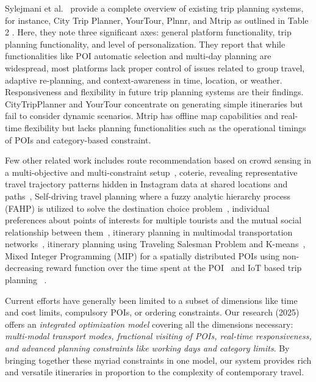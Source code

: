 Sylejmani et al.~\cite{sylejmani2011survey} provide a complete overview of existing trip planning systems, for instance, City Trip Planner, YourTour, Plnnr, and Mtrip as outlined in Table 2 . Here, they note three significant axes: general platform functionality, trip planning functionality, and level of personalization. They report that while functionalities like POI automatic selection and multi-day planning are widespread, most platforms lack proper control of issues related to group travel, adaptive re-planning, and context-awareness in time, location, or weather. Responsiveness and flexibility in future trip planning systems are their findings. CityTripPlanner and YourTour concentrate on generating simple itineraries but fail to consider dynamic scenarios. Mtrip has offline map capabilities and real-time flexibility but lacks planning functionalities such as the operational timings of POIs and category-based constraint.

Few other related work includes route recommendation based on crowd sensing in a multi-objective and multi-constraint setup~\cite{zheng2021novel}, coterie, revealing representative travel trajectory patterns hidden in Instagram data at shared locations and paths~\cite{yu2017mining}, Self-driving travel planning where a fuzzy analytic hierarchy process (FAHP) is utilized to solve the destination choice problem~\cite{jiaoman2018travel}, individual preferences about points of interests for multiple tourists and the mutual social relationship between them~\cite{sylejmani2017planning}, itinerary planning in multimodal transportation networks~\cite{zografos2008algorithms}, itinerary planning using Traveling Salesman Problem and K-means~\cite{rani2018development}, Mixed Integer Programming (MIP) for a spatially distributed POIs using non-decreasing reward function over the time spent at the POI~\cite{yu2014optimal} and IoT based trip planning ~\cite{arora2024itinerary}.   

Current efforts have generally been limited to a subset of dimensions like time and cost limits, compulsory POIs, or ordering constraints. Our research (2025) offers an \emph{integrated optimization model} covering all the dimensions necessary: \emph{multi-modal transport modes, fractional visiting of POIs, real-time responsiveness, and advanced planning constraints like working days and category limits}. By bringing together these myriad constraints in one model, our system provides rich and versatile itineraries in proportion to the complexity of contemporary travel.


